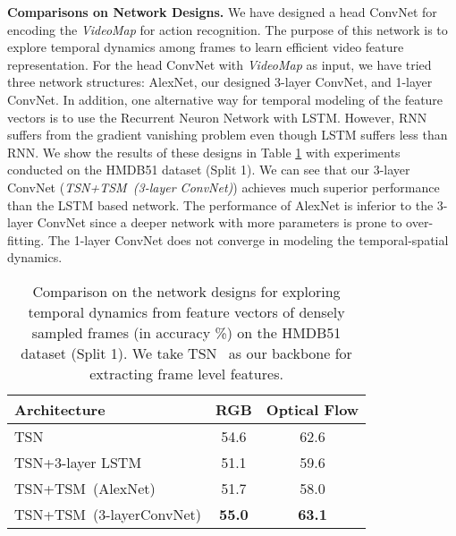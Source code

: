 \documentclass[english, 10pt, twocolumn, twoside]{IEEEtran}
\begin{document}
\noindent\textbf{Comparisons on Network Designs.} We have designed a head ConvNet for encoding the \emph{VideoMap} for action recognition. The purpose of this network is to explore temporal dynamics among frames to learn efficient video feature representation. For the head ConvNet with \emph{VideoMap} as input, we have tried three network structures: AlexNet, our designed 3-layer ConvNet, and 1-layer ConvNet. In addition, one alternative way for temporal modeling of the feature vectors is to use the Recurrent Neuron Network with LSTM. However, RNN suffers from the gradient vanishing problem even though LSTM suffers less than RNN. We show the results of these designs in Table \ref{tab:vscnn} with experiments conducted on the HMDB51 dataset (Split 1). We can see that our 3-layer ConvNet (\emph{TSN+TSM~(3-layer ConvNet)}) achieves much superior performance than the LSTM based network. The performance of AlexNet is inferior to the 3-layer ConvNet since a deeper network with more parameters is prone to over-fitting. The 1-layer ConvNet does not converge in modeling the temporal-spatial dynamics.



\begin{table}[t]
 \caption{Comparison on the network designs for exploring temporal dynamics from feature vectors of densely sampled frames (in accuracy \%) on the HMDB51 dataset (Split 1). We take TSN~\cite{wang2016temporal} as our backbone for extracting frame level features.}
 \fontsize{9pt}{10pt}\selectfont\centering
 \label{tab:vscnn}
 \begin{center}
   \begin{tabular}{|l|c|c|}
     \hline
     Architecture & RGB & Optical Flow \\
     \hline\hline
     TSN \cite{wang2016temporal} & 54.6 & 62.6 \\
TSN+3-layer LSTM & 51.1 & 59.6 \\
TSN+TSM~(AlexNet) & 51.7 & 58.0 \\
TSN+TSM~(3-layerConvNet) & \textbf{55.0} & \textbf{63.1} \\
\hline
   \end{tabular}
 \end{center}
\vspace{-2mm}
\end{table}
\end{document}
